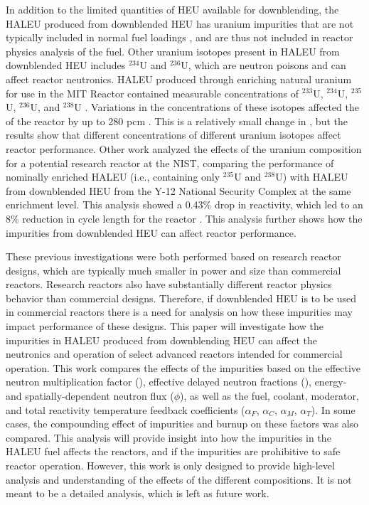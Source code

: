 In addition to the limited quantities of \gls*{HEU} available for 
downblending, the \gls*{HALEU} produced from downblended \gls*{HEU}
has uranium impurities that are not typically included in normal 
fuel loadings \cite{vaden_isotopic_2018,nelson_foreign_2010}, 
and are thus not included in reactor physics analysis of the fuel. 
Other uranium isotopes present in \gls*{HALEU} from downblended 
\gls*{HEU} includes
$^{234}$U and $^{236}$U, which are neutron poisons and 
can affect reactor neutronics. 
\gls*{HALEU} produced through enriching natural uranium for use 
in the \gls*{MIT} Reactor 
contained measurable concentrations of $^{233}$U, $^{234}$U, $^{235}$U,
$^{236}$U, and $^{238}$U \cite{mascolino_impact_2022}.
Variations in the concentrations of these isotopes affected 
the \keff of the reactor by up to 280 pcm 
\cite{mascolino_impact_2022}. 
This is a relatively small change in \keff, but the 
results show that different concentrations of different uranium 
isotopes affect reactor performance. 
Other work analyzed the effects of the uranium composition 
for a potential research reactor at the \gls*{NIST}, comparing the 
performance of nominally enriched \gls*{HALEU} (i.e., containing 
only $^{235}$U and $^{238}$U) with 
\gls*{HALEU} from downblended \gls*{HEU} from the Y-12 National 
Security Complex \cite{celikten_effects_2021} at the same 
enrichment level. This analysis 
showed a 0.43\% drop in reactivity, which led to an 8\% 
reduction in cycle length for the reactor 
\cite{celikten_effects_2021}.
This analysis further shows how the impurities from downblended 
\gls*{HEU} can affect reactor performance. 

These previous investigations were both performed based on research 
reactor designs, which are typically much smaller in power and 
size than commercial reactors. Research reactors also have 
substantially different reactor physics behavior than commercial 
designs. Therefore, if downblended 
\gls*{HEU} is to be used in commercial reactors there is a 
need for analysis
on how these impurities may impact performance of these designs. 
This paper will investigate how the 
impurities in \gls*{HALEU} produced from downblending \gls*{HEU} can 
affect the neutronics and operation of select advanced reactors 
intended for commercial operation. This work compares the effects of 
the impurities based on the effective neutron 
multiplication factor 
(\keff), effective delayed neutron fractions (\betaEff), 
energy- and 
spatially-dependent neutron flux ($\phi$), as well as the fuel, 
coolant, 
moderator, and total reactivity temperature feedback coefficients
($\alpha_F$, $\alpha_C$, $\alpha_M$, $\alpha_T$). In some cases, 
the compounding effect of impurities and burnup on these 
factors was also compared. 
This analysis will provide 
insight into how the impurities in the \gls*{HALEU} fuel affects 
the reactors, and if the impurities are prohibitive to
safe reactor operation. However, this work is only designed to 
provide high-level analysis and understanding of the effects 
of the different compositions. It is not meant to be a detailed 
analysis, which is left as future work. 
